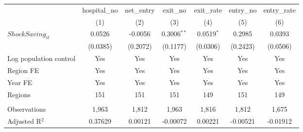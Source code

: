 \begingroup
\centering
\begin{tabular}{lcccccc}
   \toprule
                          & hospital\_no  & net\_entry  & exit\_no      & exit\_rate   & entry\_no  & entry\_rate \\    
                          & (1)           & (2)         & (3)           & (4)          & (5)        & (6)\\  
   \midrule 
   $ShockSaving_{it}$     & 0.0526        & -0.0056     & 0.3006$^{**}$ & 0.0519$^{*}$ & 0.2985     & 0.0393\\   
                          & (0.0385)      & (0.2072)    & (0.1177)      & (0.0306)     & (0.2423)   & (0.0506)\\   
   Log population control & Yes           & Yes         & Yes           & Yes          & Yes        & Yes\\  
   Region FE              & Yes           & Yes         & Yes           & Yes          & Yes        & Yes\\  
   Year FE                & Yes           & Yes         & Yes           & Yes          & Yes        & Yes\\  
   Regions                & 151           & 151         & 151           & 149          & 151        & 149\\  
    \\
   Observations           & 1,963         & 1,812       & 1,963         & 1,816        & 1,812      & 1,675\\  
   Adjusted R$^2$         & 0.37629       & 0.00121     & -0.00072      & 0.00221      & -0.00521   & -0.01912\\  
   \bottomrule
\end{tabular}
\par\endgroup
